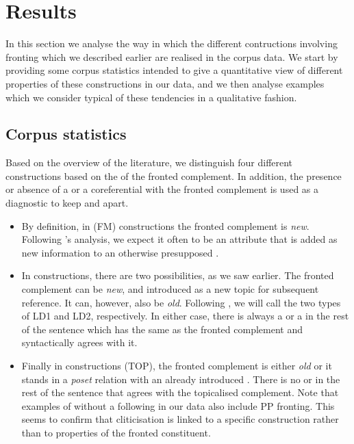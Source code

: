 \documentclass[output=paper]{LSP/langsci}
\begin{document}
\newpage 
\section{Results}
\label{section:results}

In this section we analyse the way in which the different contructions
involving fronting which we described earlier are realised in the
corpus data. We start by providing some corpus statistics intended to
give a quantitative view of different properties of these
constructions in our data, and we then analyse examples which we
consider typical of these tendencies in a qualitative fashion.

\subsection{Corpus statistics}

Based on the overview of the literature, we distinguish four different
constructions based on the  of the fronted
complement. In addition, the presence or absence of a  or a
 coreferential with the fronted complement is used as a diagnostic to keep
 and  apart.

\begin{itemize}
\item
By definition, in  (FM) constructions the fronted
complement is {\em new}. Following \citet{Prince1981a}'s analysis, we
expect it often to be an attribute that is added as new information to
an otherwise presupposed .
\item
In  constructions, there are two possibilities, as we
saw earlier. The fronted complement can be {\em new}, and introduced
as a new topic for subsequent reference. It can, however, also be {\em
  old}. Following \citet{geluykens1992}, we will call the two types of
 LD1 and LD2, respectively. In either case, there is
always a  or a  in the rest of the sentence which has the
same  as the fronted complement and syntactically agrees
with it.
\item
Finally in  constructions (TOP), the fronted complement is
either {\em old} or it stands in a {\em poset} relation with an already
introduced . There is no  or  in the rest of the
sentence that agrees with the topicalised complement.
Note that examples of  without a following  in our
data also include PP fronting. This seems to confirm that
cliticisation is linked to a specific construction rather than to
 properties of the fronted constituent.
\end{itemize}
\end{document}
